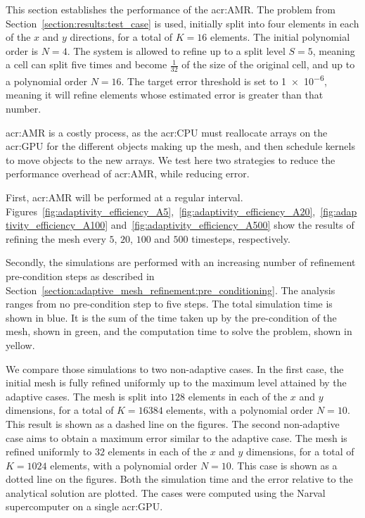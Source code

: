 This section establishes the performance of the \acrlong{acr:AMR}. The problem from
Section~\ref{section:results:test_case} is used, initially split into four elements in each of the
\(x\) and \(y\) directions, for a total of \(K = 16\) elements. The initial polynomial order is \(N
= 4\). The system is allowed to refine up to a split level \(S = 5\), meaning a cell can split five
times and become \(\frac{1}{32}\) of the size of the original cell, and up to a polynomial order \(N
= 16\). The target error threshold is set to \num{1e-6}, meaning it will refine elements whose
estimated error is greater than that number.

\Acrlong{acr:AMR} is a costly process, as the \acrshort{acr:CPU} must reallocate arrays on the
\acrshort{acr:GPU} for the different objects making up the mesh, and then schedule kernels to move
objects to the new arrays. We test here two strategies to reduce the performance overhead of
\acrlong{acr:AMR}, while reducing error.

First, \acrlong{acr:AMR} will be performed at a regular interval.
Figures~\ref{fig:adaptivity_efficiency_A5},~\ref{fig:adaptivity_efficiency_A20},~\ref{fig:adaptivity_efficiency_A100}
and~\ref{fig:adaptivity_efficiency_A500} show the results of refining the mesh every \(5\), \(20\),
\(100\) and \(500\) timesteps, respectively.

Secondly, the simulations are performed with an increasing number of refinement pre-condition steps
as described in Section~\ref{section:adaptive_mesh_refinement:pre_conditioning}. The analysis ranges
from no pre-condition step to five steps. The total simulation time is shown in blue. It is the sum
of the time taken up by the pre-condition of the mesh, shown in green, and the computation time to
solve the problem, shown in yellow.

We compare those simulations to two non-adaptive cases. In the first case, the initial mesh is fully
refined uniformly up to the maximum level attained by the adaptive cases. The mesh is split into
\(128\) elements in each of the \(x\) and \(y\) dimensions, for a total of \(K = 16384\) elements,
with a polynomial order \(N = 10\). This result is shown as a dashed line on the figures. The second
non-adaptive case aims to obtain a maximum error similar to the adaptive case. The mesh is refined
uniformly to \(32\) elements in each of the \(x\) and \(y\) dimensions, for a total of \(K = 1024\)
elements, with a polynomial order \(N = 10\). This case is shown as a dotted line on the figures.
Both the simulation time and the error relative to the analytical solution are plotted. The cases
were computed using the Narval supercomputer on a single \acrshort{acr:GPU}.

